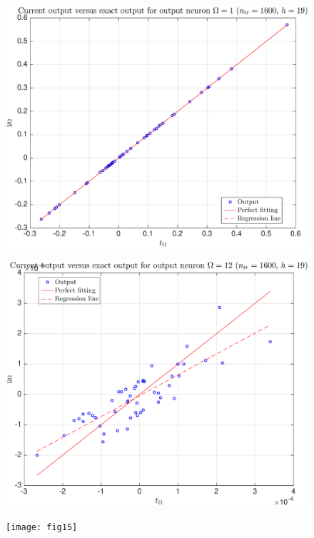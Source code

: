 \documentclass[11pt,a4paper]{article}
\theoremstyle{definition}
\theoremstyle{theorem}
\numberwithin{equation}{section}
\begin{document}
	\begin{figure}[H]
		\center
		\includegraphics[scale = 0.5]{fig13}
		\caption{}
	\end{figure}
	
	\begin{figure}[H]
		\center
		\includegraphics[scale = 0.5]{fig14}
		\caption{}
	\end{figure}
	
	\begin{figure}[H]
		\center
		\texttt{[image: fig15]}
		\caption{}
	\end{figure}
	
\end{document}
